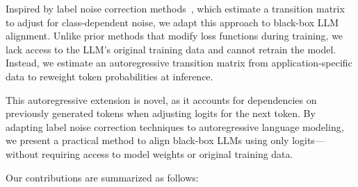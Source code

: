 Inspired by label noise correction methods~\citep{patrini2017making}, which estimate a transition matrix to adjust for class-dependent noise, we adapt this approach to black-box LLM alignment. Unlike prior methods that modify loss functions during training, we lack access to the LLM’s original training data and cannot retrain the model. Instead, we estimate an autoregressive transition matrix from application-specific data to reweight token probabilities at inference.

This autoregressive extension is novel, as it accounts for dependencies on previously generated tokens when adjusting logits for the next token. By adapting label noise correction techniques to autoregressive language modeling, we present a practical method to align black-box LLMs using only logits—without requiring access to model weights or original training data.

Our contributions are summarized as follows:
    


